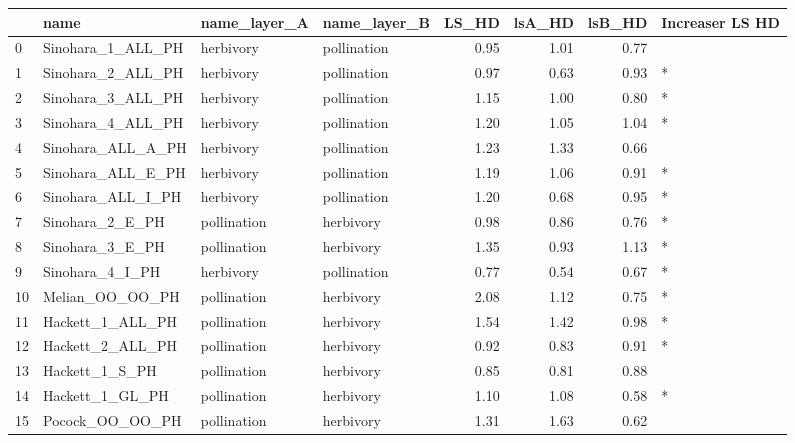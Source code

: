 \begin{tabular}{llllrrrl}
\toprule
{} &                name & name\_layer\_A & name\_layer\_B &  LS\_HD &  lsA\_HD &  lsB\_HD & Increaser LS HD \\
\midrule
0  &   Sinohara\_1\_ALL\_PH &    herbivory &  pollination &   0.95 &    1.01 &    0.77 &                 \\
1  &   Sinohara\_2\_ALL\_PH &    herbivory &  pollination &   0.97 &    0.63 &    0.93 &               * \\
2  &   Sinohara\_3\_ALL\_PH &    herbivory &  pollination &   1.15 &    1.00 &    0.80 &               * \\
3  &   Sinohara\_4\_ALL\_PH &    herbivory &  pollination &   1.20 &    1.05 &    1.04 &               * \\
4  &   Sinohara\_ALL\_A\_PH &    herbivory &  pollination &   1.23 &    1.33 &    0.66 &                 \\
5  &   Sinohara\_ALL\_E\_PH &    herbivory &  pollination &   1.19 &    1.06 &    0.91 &               * \\
6  &   Sinohara\_ALL\_I\_PH &    herbivory &  pollination &   1.20 &    0.68 &    0.95 &               * \\
7  &     Sinohara\_2\_E\_PH &  pollination &    herbivory &   0.98 &    0.86 &    0.76 &               * \\
8  &     Sinohara\_3\_E\_PH &  pollination &    herbivory &   1.35 &    0.93 &    1.13 &               * \\
9  &     Sinohara\_4\_I\_PH &    herbivory &  pollination &   0.77 &    0.54 &    0.67 &               * \\
10 &     Melian\_OO\_OO\_PH &  pollination &    herbivory &   2.08 &    1.12 &    0.75 &               * \\
11 &    Hackett\_1\_ALL\_PH &  pollination &    herbivory &   1.54 &    1.42 &    0.98 &               * \\
12 &    Hackett\_2\_ALL\_PH &  pollination &    herbivory &   0.92 &    0.83 &    0.91 &               * \\
13 &      Hackett\_1\_S\_PH &  pollination &    herbivory &   0.85 &    0.81 &    0.88 &                 \\
14 &     Hackett\_1\_GL\_PH &  pollination &    herbivory &   1.10 &    1.08 &    0.58 &               * \\
15 &     Pocock\_OO\_OO\_PH &  pollination &    herbivory &   1.31 &    1.63 &    0.62 &                 \\

\end{tabular}
